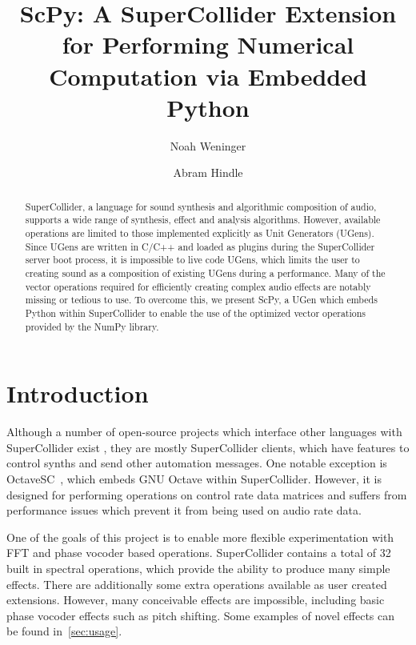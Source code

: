 \documentclass{article}
\begin{document}
\title{ScPy: A SuperCollider Extension for Performing Numerical Computation via Embedded Python}

\author{Noah Weninger \and Abram Hindle}

\maketitle

\begin{abstract}

    SuperCollider, a language for sound synthesis and algorithmic composition of audio, supports a
    wide range of synthesis, effect and analysis algorithms. However, available operations are
    limited to those implemented explicitly as Unit Generators (UGens). Since UGens are written in
    C/C++ and loaded as plugins during the SuperCollider server boot process, it is impossible to
    live code UGens, which limits the user to creating sound as a composition of existing UGens
    during a performance. Many of the vector operations required for efficiently creating complex
    audio effects are notably missing or tedious to use. To overcome this, we present ScPy, a UGen
    which embeds Python within SuperCollider to enable the use of the optimized vector operations
    provided by the NumPy library.

\end{abstract}

\section{Introduction}\label{sec:introduction}

Although a number of open-source projects which interface other languages with SuperCollider exist
\cite{systemsinterfacingwithsc,magnusson2011ixi,orlarey2009faust}, they are mostly SuperCollider
clients, which have features to control synths and send other automation messages. One notable
exception is OctaveSC~\cite{octavesc}, which embeds GNU Octave within SuperCollider. However, it
is designed for performing operations on control rate data matrices and suffers from performance
issues which prevent it from being used on audio rate data.

One of the goals of this project is to enable more flexible experimentation with FFT and phase
vocoder based operations. SuperCollider contains a total of 32 built in spectral operations,
which provide the ability to produce many simple effects. There are additionally some extra
operations available as user created extensions. However, many conceivable effects are impossible,
including basic phase vocoder effects such as pitch shifting. Some examples of novel effects can
be found in~\autoref{sec:usage}.
\end{document}
